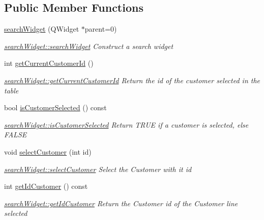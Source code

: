 \subsection*{Public Member Functions}
\begin{DoxyCompactItemize}
\item 
\hyperlink{classGui_1_1Widgets_1_1searchWidget_a8d77bcf326543f841d1c05fe9819183f}{search\+Widget} (Q\+Widget $\ast$parent=0)
\begin{DoxyCompactList}\small\item\em \hyperlink{classGui_1_1Widgets_1_1searchWidget_a8d77bcf326543f841d1c05fe9819183f}{search\+Widget\+::search\+Widget} Construct a search widget \end{DoxyCompactList}\item 
int \hyperlink{classGui_1_1Widgets_1_1searchWidget_a93c6519cc7e0d8f440451d14fb85bd31}{get\+Current\+Customer\+Id} ()
\begin{DoxyCompactList}\small\item\em \hyperlink{classGui_1_1Widgets_1_1searchWidget_a93c6519cc7e0d8f440451d14fb85bd31}{search\+Widget\+::get\+Current\+Customer\+Id} Return the id of the customer selected in the table \end{DoxyCompactList}\item 
bool \hyperlink{classGui_1_1Widgets_1_1searchWidget_a3cb27e088874c5b8c548d0346a5d85f2}{is\+Customer\+Selected} () const 
\begin{DoxyCompactList}\small\item\em \hyperlink{classGui_1_1Widgets_1_1searchWidget_a3cb27e088874c5b8c548d0346a5d85f2}{search\+Widget\+::is\+Customer\+Selected} Return T\+R\+U\+E if a customer is selected, else F\+A\+L\+S\+E \end{DoxyCompactList}\item 
void \hyperlink{classGui_1_1Widgets_1_1searchWidget_a96ba18927785257377dcd3701d41e8d1}{select\+Customer} (int id)
\begin{DoxyCompactList}\small\item\em \hyperlink{classGui_1_1Widgets_1_1searchWidget_a96ba18927785257377dcd3701d41e8d1}{search\+Widget\+::select\+Customer} Select the Customer with it {\itshape id} \end{DoxyCompactList}\item 
int \hyperlink{classGui_1_1Widgets_1_1searchWidget_a20de80dbfa207b4ecc8b12433fcebb4b}{get\+Id\+Customer} () const 
\begin{DoxyCompactList}\small\item\em \hyperlink{classGui_1_1Widgets_1_1searchWidget_a20de80dbfa207b4ecc8b12433fcebb4b}{search\+Widget\+::get\+Id\+Customer} Return the Customer id of the Customer line selected \end{DoxyCompactList}\item 

\end{DoxyCompactItemize}
